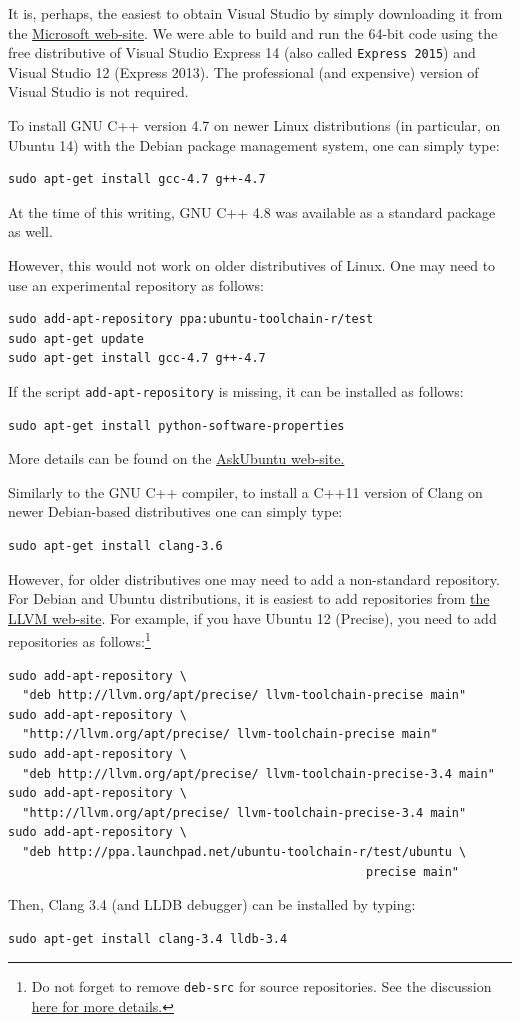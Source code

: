 \documentclass[runningheads,a4paper]{llncs}
\newcommand{\ttt}[1]{\texttt{#1}}
\begin{document}
{It is, perhaps, the easiest to obtain Visual Studio by simply downloading
it from the \href{https://www.microsoft.com/en-us/download/default.aspx}{Microsoft web-site}.
We were able to build and run the 64-bit code using the free distributive of Visual Studio Express 14 (also called 
\ttt{Express 2015}) and Visual Studio 12 (Express 2013). The professional (and expensive) version of Visual Studio is not required. 


To install GNU C++ version 4.7 on newer Linux distributions (in particular, on Ubuntu 14) with the Debian package management system, 
one can simply type:
\begin{verbatim}
sudo apt-get install gcc-4.7 g++-4.7
\end{verbatim}
At the time of this writing, GNU C++ 4.8 was available as a standard package as well.


However, this would not work on older distributives of Linux. 
One may need to use an experimental repository as follows:
\begin{verbatim}
sudo add-apt-repository ppa:ubuntu-toolchain-r/test
sudo apt-get update
sudo apt-get install gcc-4.7 g++-4.7
\end{verbatim}
If the script \ttt{add-apt-repository} is missing, it can be installed as follows:
\begin{verbatim}
sudo apt-get install python-software-properties
\end{verbatim}
More details can be found on the \href{http://askubuntu.com/questions/113291/how-do-i-install-gcc-4-7}{AskUbuntu web-site.}

Similarly to the GNU C++ compiler, to install a C++11 version of Clang on newer Debian-based distributives one can simply type:
\begin{verbatim}
sudo apt-get install clang-3.6
\end{verbatim}

However, for older distributives one may need to add a non-standard repository.
For Debian and Ubuntu distributions, it is easiest to add repositories from \href{http://llvm.org/apt/}{the LLVM web-site}. 
For example, if you have Ubuntu 12 (Precise), you need to add repositories
as follows:\footnote{Do not forget to remove \ttt{deb-src} for source repositories.
See the discussion \href{http://askubuntu.com/questions/160511/why-does-add-apt-repository-fail-to-add-source-repositories}{here for more details.}}
\begin{verbatim}
sudo add-apt-repository \
  "deb http://llvm.org/apt/precise/ llvm-toolchain-precise main"
sudo add-apt-repository \
  "http://llvm.org/apt/precise/ llvm-toolchain-precise main"
sudo add-apt-repository \
  "deb http://llvm.org/apt/precise/ llvm-toolchain-precise-3.4 main"
sudo add-apt-repository \
  "http://llvm.org/apt/precise/ llvm-toolchain-precise-3.4 main"
sudo add-apt-repository \
  "deb http://ppa.launchpad.net/ubuntu-toolchain-r/test/ubuntu \
                                                  precise main"
\end{verbatim}
Then, Clang 3.4 (and LLDB debugger) can be installed by typing:
\begin{verbatim}
sudo apt-get install clang-3.4 lldb-3.4
\end{verbatim}

}
\end{document}
